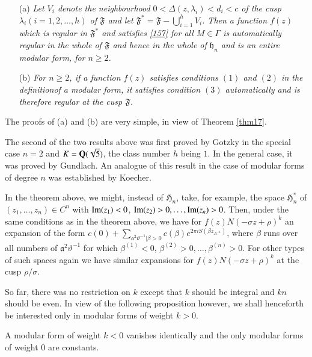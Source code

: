 \begin{itemize}
\item[(a)] {\em Let $V_{i}$ denote the neighbourhood
  $0<\Delta(z,\lambda_{i})<d_{i}<c$ of the cusp
  $\lambda_{i}(i=1,2,\ldots,h)$ of $\mathfrak{F}$ and let
  $\mathfrak{F}^{\ast}=\mathfrak{F}-\bigcup\limits^{h}_{i=1}V_{i}$. Then
  a function $f(z)$ which is regular in $\mathfrak{F}^{\ast}$ and
  satisfies \eqref{157} for all $M\in\Gamma$ is automatically regular
  in the whole of $\mathfrak{F}$ and hence in the whole of
  $\mathfrak{h}_{n}$ and is an entire modular form, for $n\geq 2$.}

\item[(b)] {\em For $n\geq 2$, if a function $f(z)$ satisfies
  conditions $(1)$ and $(2)$ in the definition\pageoriginale of a
  modular form, it satisfies condition $(3)$ automatically and is
  therefore regular at the cusp $\mathfrak{F}$.}
\end{itemize}

The proofs of (a) and (b) are very simple, in view of Theorem
\ref{thm17}.

The second of the two results above was first proved by Gotzky in the
special case $n=2$ and $K=\mathbf{Q}(\sqrt{5})$, the class number $h$ being
$1$. In the general case, it was proved by Gundlach. An analogue of
this result in the case of modular forms of degree $n$ was established
by Koecher.

In the theorem above, we might, instead of $\mathfrak{H}_{n}$, take,
for example, the space $\mathfrak{H}^{\ast}_{n}$ of
$(z_{1},\ldots,z_{n})\in C^{n}$ with $\operatorname{Im}(z_{1})<0$,
$\operatorname{Im}(z_{2})>0,\ldots,\operatorname{Im}(z_{n})>0$.  Then, under the same conditions
as in the theorem above, we have for $f(z)N(-\sigma z+\rho)^{k}$ an
expansion of the form
$c(0)+\sum\limits_{\mathfrak{a}^{2}\vartheta^{-1}|\beta>0}c(\beta)e^{2\pi
  iS(\beta z_{A^{-1}})}$, where $\beta$ runs over all numbers of
$\mathfrak{a}^{2}\vartheta^{-1}$ for which $\beta^{(1)}<0$,
$\beta^{(2)}>0,\ldots,\beta^{(n)}>0$. For other types of such spaces
again we have similar expansions for $f(z)N(-\sigma z+\rho)^{k}$ at
the cusp $\rho/\sigma$.

So far, there was no restriction on $k$ except that $k$ should be
integral and $kn$ should be even. In view of the following proposition
however, we shall henceforth be interested only in modular forms of
weight $k>0$.

\begin{proposition}\label{prop24}
A modular form of weight $k<0$ vanishes identically and the only
modular forms of weight $0$ are constants.
\end{proposition}

